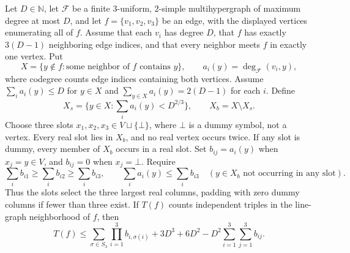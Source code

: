 \begin{lemma}
Let $D\in\mathbb N$, let $\mathcal F$ be a finite $3$-uniform,
$2$-simple multihypergraph of maximum degree at most $D$, and let
$f=\{v_1,v_2,v_3\}$ be an edge, with the displayed vertices enumerating
all of $f$. Assume that each $v_i$ has degree $D$, that $f$ has exactly
$3(D-1)$ neighboring edge indices, and that every neighbor meets $f$ in
exactly one vertex. Put
\[
X=\{y\notin f:\text{some neighbor of }f\text{ contains }y\},
\qquad a_i(y)=\deg_{\mathcal F}(v_i,y),
\]
where codegree counts edge indices containing both vertices. Assume
$\sum_i a_i(y)\le D$ for $y\in X$ and
$\sum_{y\in X}a_i(y)=2(D-1)$ for each $i$. Define
\[
X_s=\{y\in X:\sum_i a_i(y)<D^{2/3}\},\qquad X_b=X\setminus X_s.
\]
Choose three slots $x_1,x_2,x_3\in V\sqcup\{\bot\}$, where $\bot$
is a dummy symbol, not a vertex. Every real slot lies in $X_b$, and no
real vertex occurs twice. If any slot is dummy, every member of $X_b$
occurs in a real slot. Set $b_{ij}=a_i(y)$ when $x_j=y\in V$, and
$b_{ij}=0$ when $x_j=\bot$. Require
\[
\sum_i b_{i1}\ge\sum_i b_{i2}\ge\sum_i b_{i3},\qquad
\sum_i a_i(y)\le\sum_i b_{i3}
\quad(y\in X_b\text{ not occurring in any slot}).
\]
Thus the slots select the three largest real columns, padding with zero
dummy columns if fewer than three exist. If $T(f)$ counts independent
triples in the line-graph neighborhood of $f$, then
\[
T(f)\le\sum_{\sigma\in S_3}\prod_{i=1}^3 b_{i,\sigma(i)}
       +3D^3+6D^2-D^2\sum_{i=1}^3\sum_{j=1}^3 b_{ij}.
\]
\end{lemma}
